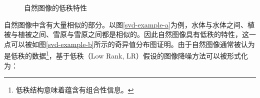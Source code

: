 \documentclass[12pt, a4paper]{article}
\begin{document}
\begin{figure}[H]
\centering
{}

\caption{自然图像的低秩特性}
\label{svd-example}
\end{figure}
\par 自然图像中含有大量相似的部分。以图\ref{svd-example-a}为例，水体与水体之间、植被与植被之间、雪原与雪原之间都是相似的。因此自然图像具有低秩的特性，这一点可以被如图\ref{svd-example-b}所示的奇异值分布图证明。由于自然图像通常被认为是低秩的数据\footnote{低秩结构意味着蕴含有组合性信息。}\cite{TNN-1}，基于低秩（Low Rank, LR）假设的图像降噪方法可以被形式化为：
\end{document}

